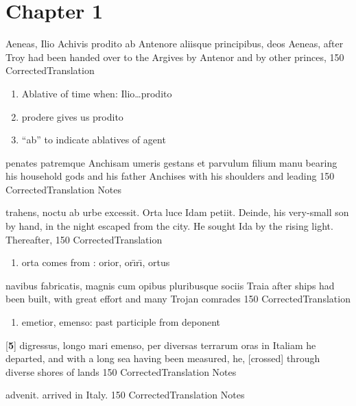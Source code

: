 \chapter*{Chapter 1} %
\label{sec:chapter_1}

\latline
  {Aeneas, Ilio Achivis prodito ab Antenore aliisque principibus, deos}
  { Aeneas, after Troy had been handed over to the Argives by Antenor and by other princes, }
  {150}
  { CorrectedTranslation }
  { \begin{enumerate}
  	\item Ablative of time when:  Ilio{\ldots}prodito
  	\item prodere gives us prodito
  	\item ``ab'' to indicate ablatives of agent
  \end{enumerate} }


\latline
  {penates patremque Anchisam umeris gestans et parvulum filium manu}
  { bearing his household gods and his father Anchises with his shoulders and leading}
  {150}
  { CorrectedTranslation }
  { Notes }


\latline
  {trahens, noctu ab urbe excessit.  Orta luce Idam petiit. Deinde,}
  { his very-small son by hand, in the night escaped from the city.  He sought Ida by the rising light.  Thereafter, }
  {150}
  { CorrectedTranslation }
  { \begin{enumerate}
  	\item orta comes from : orior, or\={\i}r\={\i}, ortus
  \end{enumerate} }


\latline
  {navibus fabricatis, magnis cum opibus pluribusque sociis Traia}
  { after ships had been built, with great effort and many Trojan comrades }
  {150}
  { CorrectedTranslation }
  { \begin{enumerate}
  	\item emetior, emenso:  past participle from deponent
  \end{enumerate} }


\latline
  {[\textbf{5}] digressus, longo mari emenso, per diversas terrarum oras in Italiam}
  { he departed, and with a long sea having been measured, he, [crossed] through diverse shores of lands}
  {150}
  { CorrectedTranslation }
  { Notes }


\latline
  {advenit.}
  {arrived in Italy. }
  {150}
  { CorrectedTranslation }
  { Notes }


